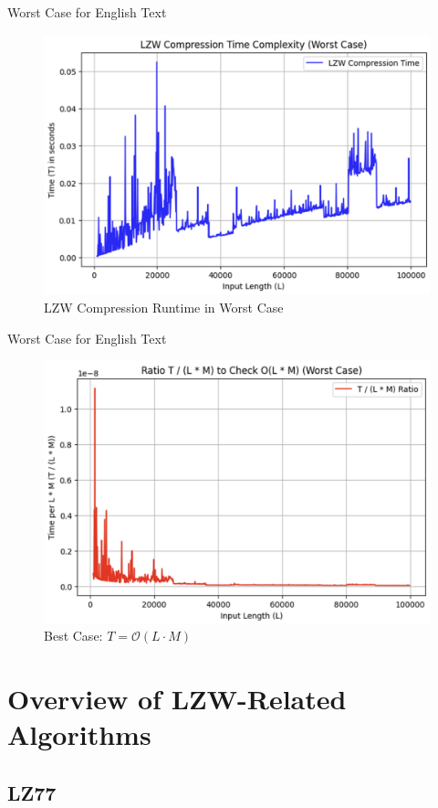 \documentclass[10pt,handout,english]{beamer}
\begin{document}
\begin{frame}{Worst Case for English Text}
    \begin{figure}[ht]
    \centering
    \includegraphics[width=0.5\linewidth]{pic/worst_case.png}
    \caption{LZW Compression Runtime in Worst Case}
    \label{fig:bestcase}
    \end{figure}
\end{frame}

\begin{frame}{Worst Case for English Text}
    \begin{figure}[ht]
    \centering
    \includegraphics[width=0.5\linewidth]{pic/worstcase_prove.png}
    \caption{Best Case: $T = \mathcal{O}(L \cdot M)$}
    \label{fig:enter-label}
\end{figure}
\end{frame}

\newpage

\section{Overview of LZW-Related Algorithms}

\subsection{LZ77}
\end{document}
